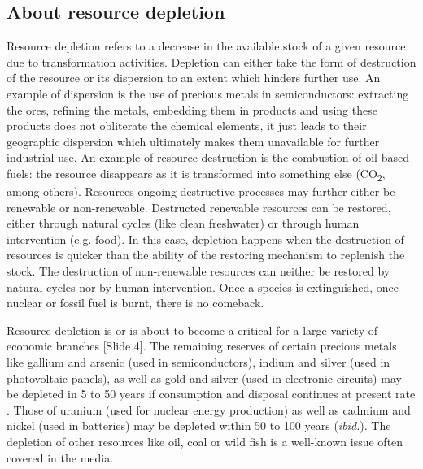 \documentclass{article}
\begin{document}
\subsection{About resource depletion}
\label{sec:depletion}
Resource depletion refers to a decrease in the available stock of a given resource due to transformation activities. Depletion can either take the form of destruction of the resource or its dispersion to an extent which hinders further use. An example of dispersion is the use of precious metals in semiconductors: extracting the ores, refining the metals, embedding them in products and using these products does not obliterate the chemical elements, it just leads to their geographic dispersion which ultimately makes them unavailable for further industrial use. An example of resource destruction is the combustion of oil-based fuels: the resource disappears as it is transformed into something else (CO\textsubscript{2}, among others). Resources ongoing destructive processes may further either be renewable or non-renewable. Destructed renewable resources can be restored, either through natural cycles (like clean freshwater) or through human intervention (e.g. food). In this case, depletion happens when the destruction of resources is quicker than the ability of the restoring mechanism to replenish the stock. The destruction of non-renewable resources can neither be restored by natural cycles nor by human intervention. Once a species is extinguished, once nuclear or fossil fuel is burnt, there is no comeback.

Resource depletion is or is about to become a critical for a large variety of economic branches {\color{blue}[Slide 4]}. The remaining reserves of certain precious metals like gallium and arsenic (used in semiconductors), indium and silver (used in photovoltaic panels), as well as gold and silver (used in electronic circuits) may be depleted in 5 to 50 years if consumption and disposal continues at present rate \cite{dodsonElementalSustainabilityTotal2012}. Those of uranium (used for nuclear energy production) as well as cadmium and nickel (used in batteries) may be depleted within 50 to 100 years (\emph{ibid.}). The depletion of other resources like oil, coal or wild fish is a well-known issue often covered in the media. 
\end{document}
